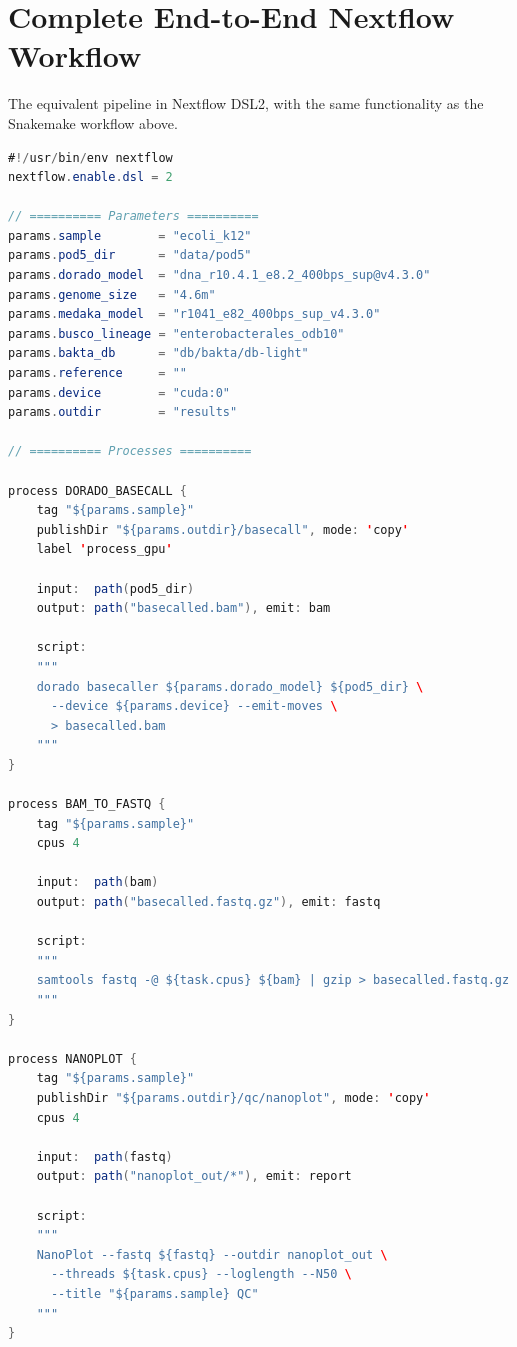 \section{Complete End-to-End Nextflow Workflow}
\label{sec:diyanalysis:full_nextflow}

The equivalent pipeline in Nextflow DSL2, with the same functionality as the Snakemake workflow above.

\begin{lstlisting}[language=Java,caption={Complete end-to-end Nextflow pipeline for nanopore analysis (main.nf).},label=lst:diy-nf-e2e]
#!/usr/bin/env nextflow
nextflow.enable.dsl = 2

// ========== Parameters ==========
params.sample        = "ecoli_k12"
params.pod5_dir      = "data/pod5"
params.dorado_model  = "dna_r10.4.1_e8.2_400bps_sup@v4.3.0"
params.genome_size   = "4.6m"
params.medaka_model  = "r1041_e82_400bps_sup_v4.3.0"
params.busco_lineage = "enterobacterales_odb10"
params.bakta_db      = "db/bakta/db-light"
params.reference     = ""
params.device        = "cuda:0"
params.outdir        = "results"

// ========== Processes ==========

process DORADO_BASECALL {
    tag "${params.sample}"
    publishDir "${params.outdir}/basecall", mode: 'copy'
    label 'process_gpu'

    input:  path(pod5_dir)
    output: path("basecalled.bam"), emit: bam

    script:
    """
    dorado basecaller ${params.dorado_model} ${pod5_dir} \
      --device ${params.device} --emit-moves \
      > basecalled.bam
    """
}

process BAM_TO_FASTQ {
    tag "${params.sample}"
    cpus 4

    input:  path(bam)
    output: path("basecalled.fastq.gz"), emit: fastq

    script:
    """
    samtools fastq -@ ${task.cpus} ${bam} | gzip > basecalled.fastq.gz
    """
}

process NANOPLOT {
    tag "${params.sample}"
    publishDir "${params.outdir}/qc/nanoplot", mode: 'copy'
    cpus 4

    input:  path(fastq)
    output: path("nanoplot_out/*"), emit: report

    script:
    """
    NanoPlot --fastq ${fastq} --outdir nanoplot_out \
      --threads ${task.cpus} --loglength --N50 \
      --title "${params.sample} QC"
    """
}


\end{lstlisting}
